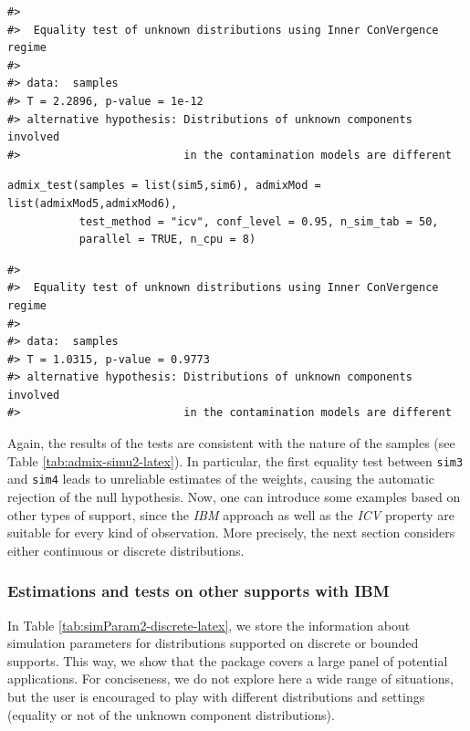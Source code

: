 \begin{verbatim}
#> 
#>  Equality test of unknown distributions using Inner ConVergence regime
#> 
#> data:  samples
#> T = 2.2896, p-value = 1e-12
#> alternative hypothesis: Distributions of unknown components involved 
#>                         in the contamination models are different
\end{verbatim}

\begin{verbatim}
admix_test(samples = list(sim5,sim6), admixMod = list(admixMod5,admixMod6),
           test_method = "icv", conf_level = 0.95, n_sim_tab = 50,
           parallel = TRUE, n_cpu = 8)
\end{verbatim}

\begin{verbatim}
#> 
#>  Equality test of unknown distributions using Inner ConVergence regime
#> 
#> data:  samples
#> T = 1.0315, p-value = 0.9773
#> alternative hypothesis: Distributions of unknown components involved 
#>                         in the contamination models are different
\end{verbatim}

Again, the results of the tests are consistent with the nature of the samples (see Table \ref{tab:admix-simu2-latex}). In particular, the first equality test between \texttt{sim3} and \texttt{sim4} leads to unreliable estimates of the weights, causing the automatic rejection of the null hypothesis. Now, one can introduce some examples based on other types of support, since the \emph{IBM} approach as well as the \emph{ICV} property are suitable for every kind of observation. More precisely, the next section considers either continuous or discrete distributions.

\subsubsection{Estimations and tests on other supports with IBM}\label{estimations-and-tests-on-other-supports-with-ibm}

In Table \ref{tab:simParam2-discrete-latex}, we store the information about simulation parameters for distributions supported on discrete or bounded supports. This way, we show that the package covers a large panel of potential applications. For conciseness, we do not explore here a wide range of situations, but the user is encouraged to play with different distributions and settings (equality or not of the unknown component distributions).

